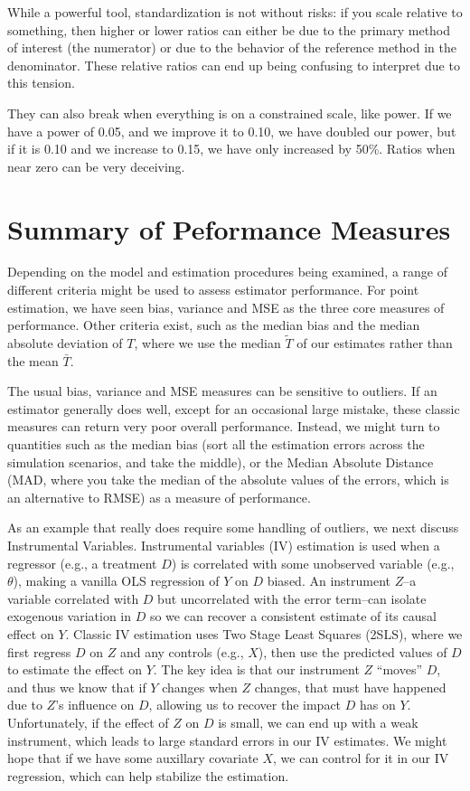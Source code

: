 \documentclass[
]{book}
\begin{document}
While a powerful tool, standardization is not without risks: if you scale relative to something, then higher or lower ratios can either be due to the primary method of interest (the numerator) or due to the behavior of the reference method in the denominator.
These relative ratios can end up being confusing to interpret due to this tension.

They can also break when everything is on a constrained scale, like power.
If we have a power of 0.05, and we improve it to 0.10, we have doubled our power, but if it is 0.10 and we increase to 0.15, we have only increased by 50\%.
Ratios when near zero can be very deceiving.

\section{Summary of Peformance Measures}\label{summary-of-peformance-measures}

Depending on the model and estimation procedures being examined, a range of different criteria might be used to assess estimator performance.
For point estimation, we have seen bias, variance and MSE as the three core measures of performance.
Other criteria exist, such as the median bias and the median absolute deviation of \(T\), where we use the median \(\tilde{T}\) of our estimates rather than the mean \(\bar{T}\).

The usual bias, variance and MSE measures can be sensitive to outliers.
If an estimator generally does well, except for an occasional large mistake, these classic measures can return very poor overall performance.
Instead, we might turn to quantities such as the median bias (sort all the estimation errors across the simulation scenarios, and take the middle), or the Median Absolute Distance (MAD, where you take the median of the absolute values of the errors, which is an alternative to RMSE) as a measure of performance.

As an example that really does require some handling of outliers, we next discuss Instrumental Variables.
Instrumental variables (IV) estimation is used when a regressor (e.g., a treatment \(D\)) is correlated with some unobserved variable (e.g., \(\theta\)), making a vanilla OLS regression of \(Y\) on \(D\) biased.
An instrument \(Z\)--a variable correlated with \(D\) but uncorrelated with the error term--can isolate exogenous variation in \(D\) so we can recover a consistent estimate of its causal effect on \(Y\).
Classic IV estimation uses Two Stage Least Squares (2SLS), where we first regress \(D\) on \(Z\) and any controls (e.g., \(X\)), then use the predicted values of \(D\) to estimate the effect on \(Y\).
The key idea is that our instrument \(Z\) ``moves'' \(D\), and thus we know that if \(Y\) changes when \(Z\) changes, that must have happened due to \(Z\)'s influence on \(D\), allowing us to recover the impact \(D\) has on \(Y\).
Unfortunately, if the effect of \(Z\) on \(D\) is small, we can end up with a weak instrument, which leads to large standard errors in our IV estimates.
We might hope that if we have some auxillary covariate \(X\), we can control for it in our IV regression, which can help stabilize the estimation.
\end{document}
